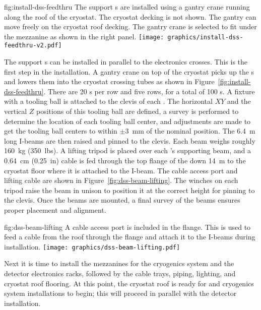 \begin{dunefigure}{fig:install-dss-feedthru}
  {The  support \fdth{}s  are installed using a gantry crane running along the roof of the cryostat.
  The cryostat decking is not shown. 
  The gantry can move freely on the cryostat roof decking. The gantry crane is selected to fit under the mezzanine as shown in the right panel.
  }
  \texttt{[image: graphics/install-dss-feedthru-v2.pdf]}
\end{dunefigure}


The  support \fdth{}s can be installed in parallel to the  electronics crosses. This is the first step in the  installation. 
A gantry crane on top of the cryostat picks up the \fdth{}s  and lowers them into the cryostat crossing tubes as shown in Figure~\ref{fig:install-dss-feedthru}. 
There are \num{20} \fdth{}s per row and five rows, for a total of \num{100} \fdth{}s.  A fixture with a tooling ball is attached to the clevis of each \fdth{}.  
The horizontal $XY$ and the vertical $Z$ positions of this tooling ball are defined, a survey is performed to determine the location of each tooling ball center, and adjustments are made to get the tooling ball centers to within $\pm$\SI{3}{mm} of the nominal position.  
The \SI{6.4}{m} long I-beams are then raised and pinned to the clevis.  
Each beam weighs roughly \SI{160}{kg} (\SI{350}{lbs}). 
A lifting tripod is placed over each  \fdth{}'s supporting beam, and a \SI{0.64}{cm} (\SI{0.25}{in})  cable is fed through the top flange of the \fdth down \SI{14}{m} to the cryostat floor where it is attached to the I-beam. 
The cable access port and lifting cable are shown in Figure~\ref{fig:dss-beam-lifting}. 
The winches on each tripod raise the beam in unison to position it at the correct height for pinning to the \fdth clevis.  Once the beams are mounted, a final survey of the beams ensures proper placement and alignment. 
 \begin{dunefigure}{fig:dss-beam-lifting}
  {A cable access port is included in the  flange. This is used to feed a cable from the roof through the flange and attach it to the I-beams during  installation.}
 \texttt{[image: graphics/dss-beam-lifting.pdf]}
\end{dunefigure}


Next it is time to install the mezzanines for the cryogenics system and the detector electronics racks, followed by the cable trays,  piping, lighting, and cryostat roof flooring. At this point, the cryostat roof is ready for  and cryogenics system installations to begin; this will proceed in parallel with the detector installation.





